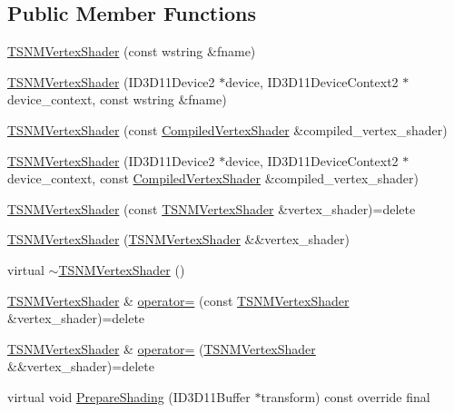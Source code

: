 \subsection*{Public Member Functions}
\begin{DoxyCompactItemize}
\item 
\hyperlink{classmage_1_1_t_s_n_m_vertex_shader_a4cba7b2ef6a6d972560db25ccae7cf37}{T\+S\+N\+M\+Vertex\+Shader} (const wstring \&fname)
\item 
\hyperlink{classmage_1_1_t_s_n_m_vertex_shader_a08778a7323099f0002a639e95dde5ad3}{T\+S\+N\+M\+Vertex\+Shader} (I\+D3\+D11\+Device2 $\ast$device, I\+D3\+D11\+Device\+Context2 $\ast$device\+\_\+context, const wstring \&fname)
\item 
\hyperlink{classmage_1_1_t_s_n_m_vertex_shader_a007414d2ff4a686961e41466b6bf6920}{T\+S\+N\+M\+Vertex\+Shader} (const \hyperlink{structmage_1_1_compiled_vertex_shader}{Compiled\+Vertex\+Shader} \&compiled\+\_\+vertex\+\_\+shader)
\item 
\hyperlink{classmage_1_1_t_s_n_m_vertex_shader_a378092b8cd15d352f67a3c9a0cb6801c}{T\+S\+N\+M\+Vertex\+Shader} (I\+D3\+D11\+Device2 $\ast$device, I\+D3\+D11\+Device\+Context2 $\ast$device\+\_\+context, const \hyperlink{structmage_1_1_compiled_vertex_shader}{Compiled\+Vertex\+Shader} \&compiled\+\_\+vertex\+\_\+shader)
\item 
\hyperlink{classmage_1_1_t_s_n_m_vertex_shader_abd4a1b3bb7dacdc2fc602491795008b1}{T\+S\+N\+M\+Vertex\+Shader} (const \hyperlink{classmage_1_1_t_s_n_m_vertex_shader}{T\+S\+N\+M\+Vertex\+Shader} \&vertex\+\_\+shader)=delete
\item 
\hyperlink{classmage_1_1_t_s_n_m_vertex_shader_a3c4a072e8a907437e4dfc15835253da5}{T\+S\+N\+M\+Vertex\+Shader} (\hyperlink{classmage_1_1_t_s_n_m_vertex_shader}{T\+S\+N\+M\+Vertex\+Shader} \&\&vertex\+\_\+shader)
\item 
virtual \hyperlink{classmage_1_1_t_s_n_m_vertex_shader_ac753a201fc0c12978811cca636da107e}{$\sim$\+T\+S\+N\+M\+Vertex\+Shader} ()
\item 
\hyperlink{classmage_1_1_t_s_n_m_vertex_shader}{T\+S\+N\+M\+Vertex\+Shader} \& \hyperlink{classmage_1_1_t_s_n_m_vertex_shader_ad3d444a889fcb9a736d0c0d2fba4ea88}{operator=} (const \hyperlink{classmage_1_1_t_s_n_m_vertex_shader}{T\+S\+N\+M\+Vertex\+Shader} \&vertex\+\_\+shader)=delete
\item 
\hyperlink{classmage_1_1_t_s_n_m_vertex_shader}{T\+S\+N\+M\+Vertex\+Shader} \& \hyperlink{classmage_1_1_t_s_n_m_vertex_shader_a84e30879d000172f309d7ec2f27c3ed1}{operator=} (\hyperlink{classmage_1_1_t_s_n_m_vertex_shader}{T\+S\+N\+M\+Vertex\+Shader} \&\&vertex\+\_\+shader)=delete
\item 
virtual void \hyperlink{classmage_1_1_t_s_n_m_vertex_shader_ad9ee77f591466d7843bcd413e3d7093d}{Prepare\+Shading} (I\+D3\+D11\+Buffer $\ast$transform) const override final
\end{DoxyCompactItemize}
